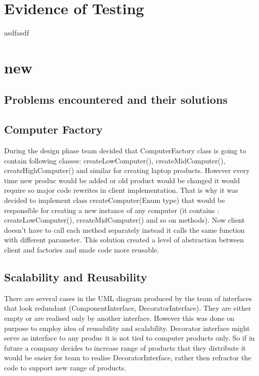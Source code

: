 \documentclass[pdftex,11pt,a4paper]{article}
\begin{document}
\section{Evidence of Testing}
asdfasdf
\pagebreak

\section{new}
\subsection{Problems encountered and their solutions}
\subsection{Computer Factory}
During the design phase team decided that ComputerFactory class is going to contain following classes: createLowComputer(), createMidComputer(), createHighComputer() and similar for creating laptop products. However every time new produc would be added or old product would be changed it would require so major code rewrites in client implementation. That is why it was decided to implement class createComputer(Enum type) that would be responsible for creating a new instance of any computer (it contains : createLowComputer(), createMidComputer() and so on methods). Now client doesn't have to call each method separately instead it calls the same function with different parameter. This solution created a level of abstraction between client and factories and made code more reusable.

\subsection{Scalability and Reusability}
There are several cases in the UML diagram produced by the team of interfaces that look redundant (ComponentInterface, DecoratorInterface). They are either empty or are realised only by another interface. However this was done on purpose to employ idea of reusability and scalability. Decorator interface might serve as interface to any produc it is not tied to computer products only. So if in future a company decides to increase range of products that they distribute it would be easier for team to realise DecoratorInterface, rather then refractor the code to support new range of products. 
\end{document}
